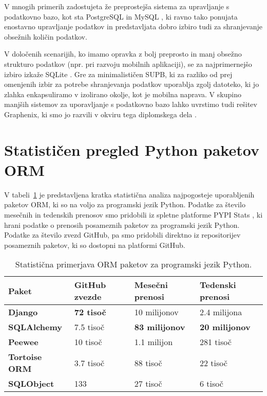 \documentclass[a4paper,12pt,openright]{book}
\begin{document}
    V mnogih primerih zadostujeta že preprostejša sistema za upravljanje s podatkovno bazo, kot sta PostgreSQL \cite{POSTGRESQL} in MySQL \cite{MYSQL}, ki ravno tako ponujata enostavno upravljanje podatkov in predstavljata dobro izbiro tudi za shranjevanje obsežnih količin podatkov. 
    
    V določenih scenarijih, ko imamo opravka z bolj preprosto in manj obsežno strukturo podatkov (npr. pri razvoju mobilnih aplikaciji), se za najprimernejšo izbiro izkaže SQLite \cite{SQLITE}. Gre za minimalističen SUPB, ki za razliko od prej omenjenih izbir za potrebe shranjevanja podatkov uporablja zgolj datoteko, ki jo zlahka enkapsuliramo v izolirano okolje, kot je mobilna naprava. V skupino manjših sistemov za uporavljanje s podatkovno bazo lahko uvrstimo tudi rešitev Graphenix, ki smo jo razvili v okviru tega diplomskega dela \cite{GRAPHENIX_GITHUB}.
    
    \section{Statističen pregled Python paketov ORM}

    V tabeli~\ref{orm_library_comparison} je predstavljena kratka statistična analiza najpogosteje uporabljenih paketov ORM, ki so na voljo za programski jezik Python. Podatke za število mesečnih in tedenskih prenosov smo pridobili iz spletne platforme PYPI Stats \cite{pypistats}, ki hrani podatke o prenosih posameznih paketov za programski jezik Python. Podatke za število zvezd GitHub, pa smo pridobili direktno iz repositorijev posameznih paketov, ki so dostopni na platformi GitHub.
    
    \begin{table}[htbp]
        \begin{center}
            \begin{tabular}{p{}|p{}|p{}|p{}}
              {\bf Paket} & {\bf GitHub zvezde} & {\bf Mesečni prenosi} & {\bf Tedenski prenosi} \\ \hline
              {\bf Django \cite{DJANGO_GITHUB}} & \textbf{\num{72} tisoč} & \num{10} milijonov & \num{2,4} milijona \\
              {\bf SQLAlchemy \cite{SQLALCHEMY_GITHUB}} & \num{7,5} tisoč &  \textbf{\num{83} milijonov} & \textbf{\num{20} milijonov} \\
              {\bf Peewee \cite{PEEWEE_GITHUB}} & \num{10} tisoč & \num{1,1} milijon & \num{281} tisoč \\
              {\bf Tortoise ORM \cite{TORTOISE_GITHUB}} & \num{3,7} tisoč & \num{88} tisoč & \num{22} tisoč \\
              {\bf SQLObject \cite{SQLOBJECT_GITHUB}} & 133 & \num{27} tisoč & \num{6} tisoč \\
            \end{tabular}
        \end{center}
        \caption{Statistična primerjava ORM paketov za programski jezik Python.}
        \label{orm_library_comparison}
    \end{table}
    
\end{document}
